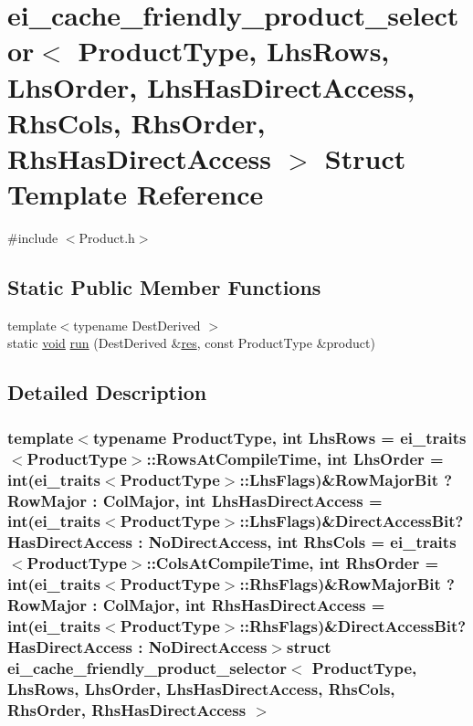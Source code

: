 \hypertarget{structei__cache__friendly__product__selector}{\section{ei\-\_\-cache\-\_\-friendly\-\_\-product\-\_\-selector$<$ Product\-Type, Lhs\-Rows, Lhs\-Order, Lhs\-Has\-Direct\-Access, Rhs\-Cols, Rhs\-Order, Rhs\-Has\-Direct\-Access $>$ Struct Template Reference}
\label{structei__cache__friendly__product__selector}
}


{\ttfamily \#include $<$Product.\-h$>$}

\subsection*{Static Public Member Functions}
\begin{DoxyCompactItemize}
\item 
{\footnotesize template$<$typename Dest\-Derived $>$ }\\static \hyperlink{group___u_a_v_objects_plugin_ga444cf2ff3f0ecbe028adce838d373f5c}{void} \hyperlink{structei__cache__friendly__product__selector_a07e32475ed693fa244557daf8f018578}{run} (Dest\-Derived \&\hyperlink{glext_8h_a1dbb21208b9047cc8031ca9c840d3c2f}{res}, const Product\-Type \&product)
\end{DoxyCompactItemize}


\subsection{Detailed Description}
\subsubsection*{template$<$typename Product\-Type, int Lhs\-Rows = ei\-\_\-traits$<$\-Product\-Type$>$\-::\-Rows\-At\-Compile\-Time, int Lhs\-Order = int(ei\-\_\-traits$<$\-Product\-Type$>$\-::\-Lhs\-Flags)\&\-Row\-Major\-Bit ? Row\-Major \-: Col\-Major, int Lhs\-Has\-Direct\-Access = int(ei\-\_\-traits$<$\-Product\-Type$>$\-::\-Lhs\-Flags)\&\-Direct\-Access\-Bit? Has\-Direct\-Access \-: No\-Direct\-Access, int Rhs\-Cols = ei\-\_\-traits$<$\-Product\-Type$>$\-::\-Cols\-At\-Compile\-Time, int Rhs\-Order = int(ei\-\_\-traits$<$\-Product\-Type$>$\-::\-Rhs\-Flags)\&\-Row\-Major\-Bit ? Row\-Major \-: Col\-Major, int Rhs\-Has\-Direct\-Access = int(ei\-\_\-traits$<$\-Product\-Type$>$\-::\-Rhs\-Flags)\&\-Direct\-Access\-Bit? Has\-Direct\-Access \-: No\-Direct\-Access$>$struct ei\-\_\-cache\-\_\-friendly\-\_\-product\-\_\-selector$<$ Product\-Type, Lhs\-Rows, Lhs\-Order, Lhs\-Has\-Direct\-Access, Rhs\-Cols, Rhs\-Order, Rhs\-Has\-Direct\-Access $>$}



